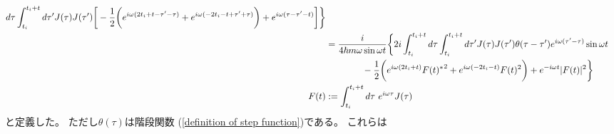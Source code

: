 \begin{subequations}
\begin{align}
        d\tau
    \int_{t_i}^{t_i + t}
        d\tau'
    J(\tau) J(\tau')
    \bigg[
    -
    \dfrac{1}{2}
    \bigg(
        e^{ i \omega (2 t_i + t - \tau' - \tau) }
    +
        e^{ i \omega ( - 2 t_i - t + \tau' + \tau) }
    \bigg)
    +
        e^{ i \omega (\tau - \tau' - t) }
    \bigg]
    \bigg\}
\notag\\&
    =
    \dfrac{i}{4 \hbar m \omega \sin \omega t}
    \bigg\{
    2 i
    \int_{t_i}^{t_i + t}
        d\tau
    \int_{t_i}^{t_i + t}
        d\tau'
    J(\tau) J(\tau')
    \theta(\tau - \tau')
        e^{ i \omega (\tau' - \tau) }
    \sin \omega t
\notag\\&\qquad\qquad
    -
    \dfrac{1}{2}
    \bigg(
        e^{ i \omega (2 t_i + t) }
        { F(t)^* }^2
    +
        e^{ i \omega ( - 2 t_i - t) }
        F(t)^2
    \bigg)
    +
        e^{ - i \omega t }
        | F(t) |^2
    \bigg\}
\\
    F(t)
    &:=
    \int_{t_i}^{t_i + t} d\tau\ 
        e^{i \omega \tau}
        J(\tau)
\end{align}
\end{subequations}
と定義した。
ただし$\theta(\tau)$は階段関数
(\ref{definition of step function})である。
これらは
